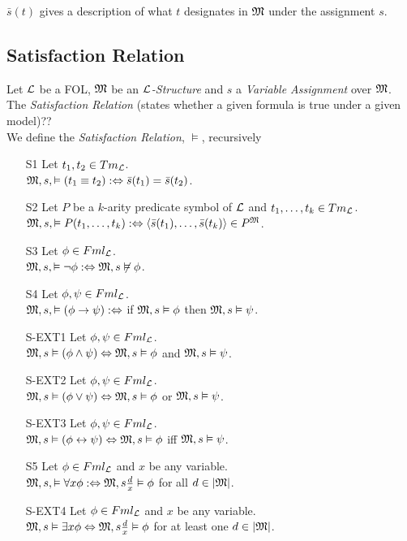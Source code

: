 \documentclass[11pt,a4paper]{article}
\begin{document}
$\bar{s}(t)$ gives a description of what $t$ designates in $\mathfrak{M}$ under the assignment $s$.

\subsection{Satisfaction Relation}

Let $\mathcal{L}$ be a FOL, $\mathfrak{M}$ be an \textit{$\mathcal{L}$-Structure} and $s$ a \textit{Variable Assignment} over $\mathfrak{M}$.\\
The \textit{Satisfaction Relation} (states whether a given formula is true under a given model)??\\
We define the \textit{Satisfaction Relation}, $\vDash$, recursively
\begin{itemize}
	\item[S1] Let $t_1,t_2\in Tm_{\mathcal{L}}$.\\
	$\mathfrak{M},s,\vDash (t_1\equiv t_2):\Leftrightarrow\bar{s}(t_1)=\bar{s}(t_2)$.
	\item[S2] Let $P$ be a $k$-arity predicate symbol of $\mathcal{L}$ and $t_1,\dots,t_k\in Tm_{\mathcal{L}}$.\\
	$\mathfrak{M},s,\vDash P(t_1,\dots,t_k):\Leftrightarrow\langle\bar{s}(t_1),\dots,\bar{s}(t_k)\rangle\in P^{\mathfrak{M}}$.
	\item[S3] Let $\phi\in Fml_{\mathcal{L}}$.\\
	$\mathfrak{M},s,\vDash \neg\phi:\Leftrightarrow\mathfrak{M},s\not\vDash\phi$.
	\item[S4] Let $\phi,\psi\in Fml_{\mathcal{L}}$.\\
	$\mathfrak{M},s,\vDash (\phi\to\psi):\Leftrightarrow$ if $\mathfrak{M},s\vDash\phi$ then $\mathfrak{M},s\vDash\psi$.
	\item[S-EXT1]Let $\phi,\psi\in Fml_{\mathcal{L}}$.\\
	$\mathfrak{M},s\vDash(\phi\wedge\psi)\Leftrightarrow\mathfrak{M},s\vDash\phi$ and $\mathfrak{M},s\vDash\psi$.
	\item[S-EXT2]Let $\phi,\psi\in Fml_{\mathcal{L}}$.\\
	$\mathfrak{M},s\vDash(\phi\vee\psi)\Leftrightarrow\mathfrak{M},s\vDash\phi$ or $\mathfrak{M},s\vDash\psi$.
	\item[S-EXT3]Let $\phi,\psi\in Fml_{\mathcal{L}}$.\\
	$\mathfrak{M},s\vDash(\phi\leftrightarrow\psi)\Leftrightarrow\mathfrak{M},s\vDash\phi$ iff $\mathfrak{M},s\vDash\psi$.
	\item[S5] Let $\phi\in Fml_{\mathcal{L}}$ and $x$ be any variable.\\
	$\mathfrak{M},s,\vDash \forall x\phi:\Leftrightarrow\mathfrak{M},s\frac{d}{x}\vDash\phi$ for all $d\in|\mathfrak{M}|$.
	\item[S-EXT4]Let $\phi\in Fml_{\mathcal{L}}$ and $x$ be any variable.\\
	$\mathfrak{M},s\vDash\exists x\phi\Leftrightarrow\mathfrak{M},s\frac{d}x\vDash\phi$ for at least one $d\in|\mathfrak{M}|$.
\end{itemize}
\end{document}
